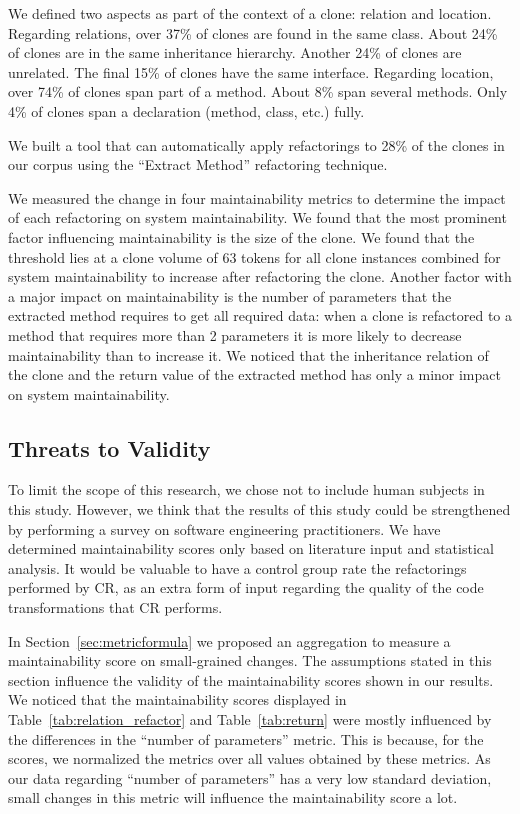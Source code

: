 \documentclass[sigconf,review,anonymous]{acmart}
\begin{document}
We defined two aspects as part of the context of a clone: relation and location. Regarding relations, over 37\% of clones are found in the same class. About 24\% of clones are in the same inheritance hierarchy. Another 24\% of clones are unrelated. The final 15\% of clones have the same interface. Regarding location, over 74\% of clones span part of a method. About 8\% span several methods. Only 4\% of clones span a declaration (method, class, etc.) fully.

We built a tool that can automatically apply refactorings to 28\% of the clones in our corpus using the ``Extract Method'' refactoring technique. 

We measured the change in four maintainability metrics
to determine the impact of each refactoring on system maintainability. We found that the most prominent factor influencing maintainability is the size of the clone. We found that the threshold lies at a clone volume of 63  %
tokens for all clone instances combined for system maintainability to increase after refactoring the clone. Another factor with a major impact on maintainability is the number of parameters that the extracted method requires to get all required data: when a clone is refactored to a method that requires more than 2 parameters it is more likely to decrease maintainability than to increase it. We noticed that the inheritance relation of the clone and the return value of the extracted method has only a minor impact on system maintainability.

\subsection{Threats to Validity}
To limit the scope of this research, we chose not to include human subjects in this study. However, we think that the results of this study could be strengthened by performing a survey on software engineering practitioners. We have determined maintainability scores only based on literature input and statistical analysis. It would be valuable to have a control group rate the refactorings performed by CR, as an extra form of input regarding the quality of the code transformations that CR performs.

In Section~\ref{sec:metricformula} we proposed an aggregation to measure a maintainability score on small-grained changes. The assumptions stated in this section influence the validity of the maintainability scores shown in our results. We noticed that the maintainability scores displayed in Table~\ref{tab:relation_refactor} and Table~\ref{tab:return} were mostly influenced by the differences in the ``number of parameters'' metric. This is because, for the scores, we normalized the metrics over all values obtained by these metrics. As our data regarding ``number of parameters'' has a very low standard deviation, small changes in this metric will influence the maintainability score a lot.
\end{document}
